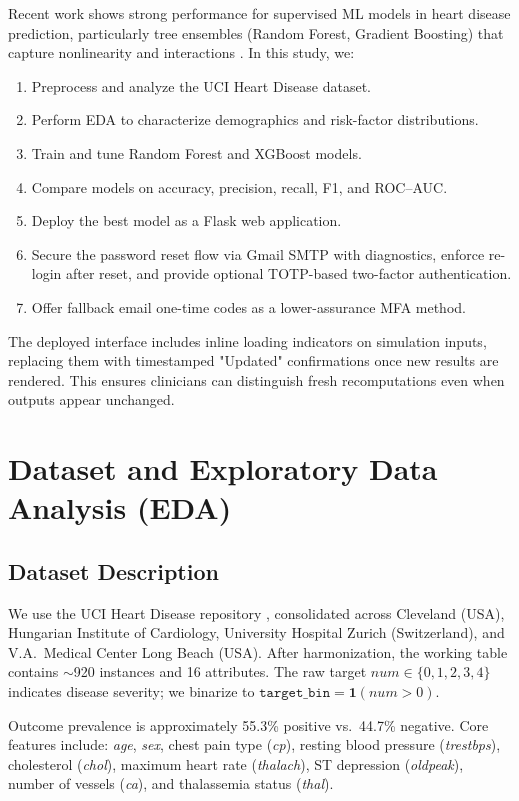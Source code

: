 \documentclass[conference]{IEEEtran}
\begin{document}
Recent work shows strong performance for supervised ML models in heart disease prediction, particularly tree ensembles (Random Forest, Gradient Boosting) that capture nonlinearity and interactions \cite{zhang2021, chen2016xgb}. In this study, we:
\begin{enumerate}
\item Preprocess and analyze the UCI Heart Disease dataset.
\item Perform EDA to characterize demographics and risk-factor distributions.
\item Train and tune Random Forest and XGBoost models.
\item Compare models on accuracy, precision, recall, F1, and ROC--AUC.
\item Deploy the best model as a Flask web application.
\item Secure the password reset flow via Gmail SMTP with diagnostics, enforce re-login after reset, and provide optional TOTP-based two-factor authentication.
\item Offer fallback email one-time codes as a lower-assurance MFA method.
\end{enumerate}

The deployed interface includes inline loading indicators on simulation
inputs, replacing them with timestamped "Updated" confirmations once new
results are rendered. This ensures clinicians can distinguish fresh
recomputations even when outputs appear unchanged.

\section{Dataset and Exploratory Data Analysis (EDA)}
\subsection{Dataset Description}
We use the UCI Heart Disease repository \cite{uci1988}, consolidated across Cleveland (USA), Hungarian Institute of Cardiology, University Hospital Zurich (Switzerland), and V.A.\ Medical Center Long Beach (USA). After harmonization, the working table contains \(\sim\)920 instances and 16 attributes. The raw target \(num \in \{0,1,2,3,4\}\) indicates disease severity; we binarize to \(\texttt{target\_bin} = \mathbf{1}(num>0)\).

Outcome prevalence is approximately 55.3\% positive vs.\ 44.7\% negative. Core features include: \textit{age}, \textit{sex}, chest pain type (\textit{cp}), resting blood pressure (\textit{trestbps}), cholesterol (\textit{chol}), maximum heart rate (\textit{thalach}), ST depression (\textit{oldpeak}), number of vessels (\textit{ca}), and thalassemia status (\textit{thal}).
\end{document}
